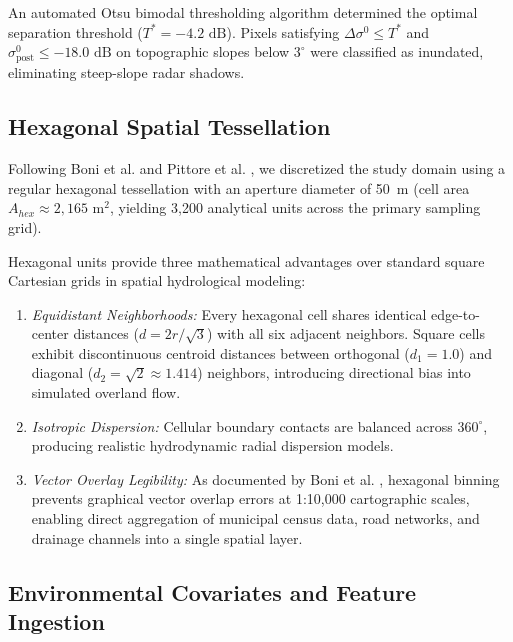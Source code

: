 \documentclass[OA,linenum]{InterPore}
\begin{document}
An automated Otsu bimodal thresholding algorithm determined the optimal separation threshold ($T^* = -4.2\text{ dB}$). Pixels satisfying $\Delta \sigma^0 \le T^*$ and $\sigma_{\text{post}}^0 \le -18.0\text{ dB}$ on topographic slopes below $3^\circ$ were classified as inundated, eliminating steep-slope radar shadows.

\subsection{Hexagonal Spatial Tessellation}

Following Boni et al. \cite{Boni2025} and Pittore et al. \cite{Pittore2018}, we discretized the study domain using a regular hexagonal tessellation with an aperture diameter of 50~m (cell area $A_{hex} \approx 2,165\text{ m}^2$, yielding 3,200 analytical units across the primary sampling grid).

Hexagonal units provide three mathematical advantages over standard square Cartesian grids in spatial hydrological modeling:
\begin{enumerate}
    \item \textit{Equidistant Neighborhoods:} Every hexagonal cell shares identical edge-to-center distances ($d = 2r/\sqrt{3}$) with all six adjacent neighbors. Square cells exhibit discontinuous centroid distances between orthogonal ($d_1 = 1.0$) and diagonal ($d_2 = \sqrt{2} \approx 1.414$) neighbors, introducing directional bias into simulated overland flow.
    \item \textit{Isotropic Dispersion:} Cellular boundary contacts are balanced across $360^\circ$, producing realistic hydrodynamic radial dispersion models.
    \item \textit{Vector Overlay Legibility:} As documented by Boni et al. \cite{Boni2025}, hexagonal binning prevents graphical vector overlap errors at 1:10,000 cartographic scales, enabling direct aggregation of municipal census data, road networks, and drainage channels into a single spatial layer.
\end{enumerate}

\subsection{Environmental Covariates and Feature Ingestion}
\end{document}
